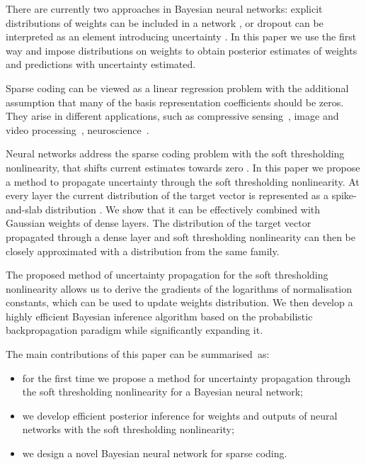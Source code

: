 \documentclass[letterpaper]{article}
\begin{document}
There are currently two approaches in Bayesian neural networks: explicit distributions of weights can be included in a network \citep{hernandez2015probabilistic, ranganath2015deep}, or dropout can be interpreted as an element introducing uncertainty \citep{gal2016dropout}. In this paper we use the first way and impose distributions on weights to obtain posterior estimates of weights and predictions with uncertainty estimated.

Sparse coding can be viewed as a linear regression problem with the additional assumption that many of the basis representation coefficients should be zeros. They arise in different applications, such as compressive sensing~\citep{candes2008introduction}, image and video processing~\citep{mairal2014sparse}, neuroscience~\citep{baillet1997bayesian, jas2017learning}. 

Neural networks address the sparse coding problem with the soft thresholding nonlinearity, that shifts current estimates towards zero \citep{gregor2010learning}. In this paper we propose a method to propagate uncertainty through the soft thresholding nonlinearity. At every layer the current distribution of the target vector is represented as a spike-and-slab distribution \citep{mitchell1988bayesian}. We show that it can be effectively combined with Gaussian weights of dense layers. The distribution of the target vector propagated through a dense layer and soft thresholding nonlinearity can then be closely approximated with a distribution from the same family.

The proposed method of uncertainty propagation for the soft thresholding nonlinearity allows us to derive the gradients of the logarithms of normalisation constants, which can be used to update weights distribution. We then develop a highly efficient Bayesian inference algorithm based on the probabilistic backpropagation paradigm while significantly expanding it.

The main contributions of this paper can be summarised~as: 
\begin{itemize}
\item for the first time we propose a method for uncertainty propagation through the soft thresholding nonlinearity for a Bayesian neural network;
\item we develop efficient posterior inference for weights and outputs of neural networks with the soft thresholding nonlinearity;
\item we design a novel Bayesian neural network for sparse coding.
\end{itemize}
\end{document}
